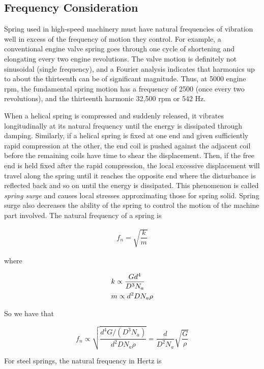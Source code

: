 \documentclass[
10pt,
a4paper,
openany,
svgnames,
]{book}
\begin{document}
\subsection{Frequency Consideration}

Spring used in high-speed machinery must have natural frequencies of vibration well in excess of the frequency of motion they control. For example, a conventional engine valve spring goes through one cycle of shortening and elongating every two engine revolutions. The valve motion is definitely not sinusoidal (single frequency), and a Fourier analysis indicates that harmonics up to about the thirteenth can be of significant magnitude. Thus, at 5000 engine rpm, the fundamental spring motion has a frequency of 2500 (once every two revolutions), and the thirteenth harmonic 32,500 rpm or 542 Hz.

When a helical spring is compressed and suddenly released, it vibrates longitudinally at its natural frequency until the energy is dissipated through damping. Similarly, if a helical spring is fixed at one end and given sufficiently rapid compression at the other, the end coil is pushed against the adjacent coil before the remaining coils have time to shear the displacement. Then, if the free end is held fixed after the rapid compression, the local excessive displacement will travel along the spring until it reaches the opposite end where the disturbance is reflected back and so on until the energy is dissipated. This phenomenon is called \emph{spring surge} and causes local stresses approximating those for spring solid. Spring surge also decreases the ability of the spring to control the motion of the machine part involved. The natural frequency of a spring is

\[\begin{gathered}
    f_n = \sqrt {\dfrac{k}{m}}
  \end{gathered} \]

where

\[\begin{gathered}
    k \propto \frac{Gd^4}{D^3N_a} \hfill \\
    m \propto d^2DN_a\rho  \hfill
\end{gathered} \]

So we have that

\[f_n \propto \sqrt {\frac{d^4G/(D^3N_a)}{d^2DN_a\rho }}  = \frac{d}{D^2N_a}\sqrt {\frac{G}{\rho }} \]

For steel springs, the natural frequency in Hertz is
\end{document}
